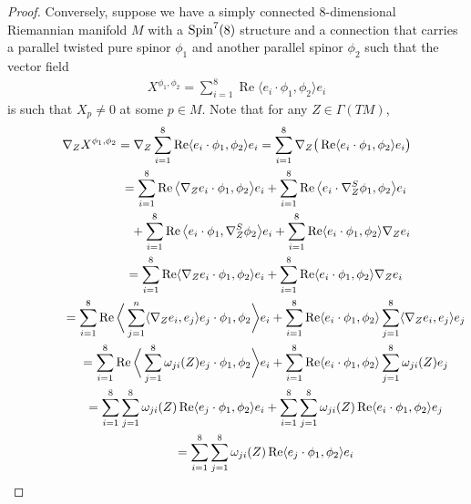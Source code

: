 \documentclass[pdftex]{sigma}
\numberwithin{equation}{section}
\begin{document}
\begin{proof}
Conversely, suppose we have a simply connected 8-dimensional Riemannian manifold $M$ with a ${\rm Spin}^7(8)$ structure and a connection that carries a parallel twisted pure spinor $\phi_1$ and another parallel spinor $\phi_2$ such that the vector field
\begin{gather*}X^{\phi_1,\phi_2}=\sum_{i=1}^8 \operatorname{Re}\langle e_i\cdot \phi_1,\phi_2\rangle e_i\end{gather*}
is such that $X_p\not=0$ at some $p\in M$. Note that for any $Z\in\Gamma(TM)$,
\begin{gather*}
\nabla_ZX^{\phi_1,\phi_2} = \nabla_Z\sum_{i=1}^8 \operatorname{Re}\langle e_i\cdot \phi_1,\phi_2\rangle e_i = \sum_{i=1}^8 \nabla_Z\big(\operatorname{Re}\langle e_i\cdot \phi_1,\phi_2\rangle e_i\big)\\
\hphantom{\nabla_ZX^{\phi_1,\phi_2}}{}
 = \sum_{i=1}^8 \operatorname{Re}\big\langle \nabla_Ze_i\cdot \phi_1,\phi_2\big\rangle e_i
 + \sum_{i=1}^8 \operatorname{Re}\big\langle e_i\cdot \nabla_Z^S\phi_1,\phi_2\big\rangle e_i\\
\hphantom{\nabla_ZX^{\phi_1,\phi_2}=}{} + \sum_{i=1}^8 \operatorname{Re}\big\langle e_i\cdot \phi_1,\nabla_Z^S\phi_2\big\rangle e_i
 + \sum_{i=1}^8 \operatorname{Re}\langle e_i\cdot \phi_1,\phi_2\rangle \nabla_Ze_i\\
 \hphantom{\nabla_ZX^{\phi_1,\phi_2}}{}
 = \sum_{i=1}^8 \operatorname{Re}\langle \nabla_Ze_i\cdot \phi_1,\phi_2\rangle e_i
 + \sum_{i=1}^8 \operatorname{Re}\langle e_i\cdot \phi_1,\phi_2\rangle \nabla_Ze_i\\
\hphantom{\nabla_ZX^{\phi_1,\phi_2}}{}
 = \sum_{i=1}^8 \operatorname{Re}\bigg\langle \sum_{j=1}^n\langle \nabla_Ze_i,e_j\rangle e_j\cdot \phi_1,\phi_2\bigg\rangle e_i
 + \sum_{i=1}^8 \operatorname{Re}\langle e_i\cdot \phi_1,\phi_2\rangle \sum_{j=1}^8\langle \nabla_Ze_i,e_j\rangle e_j\\
\hphantom{\nabla_ZX^{\phi_1,\phi_2}}{}
 = \sum_{i=1}^8 \operatorname{Re}\bigg\langle \sum_{j=1}^8\omega_{ji}(Z)e_j\cdot \phi_1,\phi_2\bigg\rangle e_i
 + \sum_{i=1}^8 \operatorname{Re}\langle e_i\cdot \phi_1,\phi_2\rangle \sum_{j=1}^8\omega_{ji}(Z)e_j\\
\hphantom{\nabla_ZX^{\phi_1,\phi_2}}{}
 = \sum_{i=1}^8 \sum_{j=1}^8\omega_{ji}(Z)\operatorname{Re}\langle e_j\cdot \phi_1,\phi_2\rangle e_i
 + \sum_{i=1}^8 \sum_{j=1}^8\omega_{ji}(Z)\operatorname{Re}\langle e_i\cdot \phi_1,\phi_2\rangle e_j\\
 \hphantom{\nabla_ZX^{\phi_1,\phi_2}}{}
 = \sum_{i=1}^8 \sum_{j=1}^8\omega_{ji}(Z)\operatorname{Re}\langle e_j\cdot \phi_1,\phi_2\rangle e_i

\end{gather*}
\end{proof}
\end{document}
